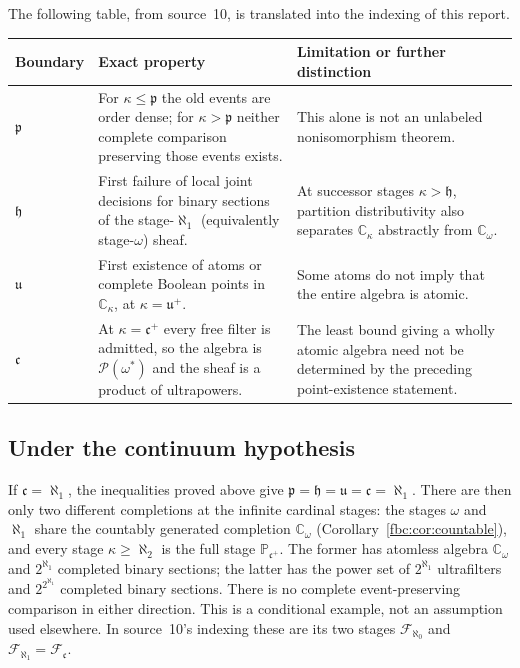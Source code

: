 \documentclass[11pt,letterpaper]{article}
\theoremstyle{definition}
\theoremstyle{remark}
\newcommand{\om}{\omega}
\newcommand{\C}{\mathbb C}
\newcommand{\PP}{\mathbb P}
\newcommand{\pow}{\mathcal P}
\newcommand{\cp}{\mathfrak p}
\newcommand{\cu}{\mathfrak u}
\newcommand{\cc}{\mathfrak c}
\newcommand{\ch}{\mathfrak h}
\begin{document}
The following table, from source~10, is translated into the indexing
of this report.
\begin{center}
\small
\begin{tabular}{@{}p{}p{}p{}@{}}
\toprule
Boundary & Exact property & Limitation or further distinction\\
\midrule
$\cp$ & For $\kappa\leq\cp$ the old events are order dense; for
$\kappa>\cp$ neither complete comparison preserving those events
exists. & This alone is not an unlabeled nonisomorphism theorem.\\[0.5em]
$\ch$ & First failure of local joint decisions for binary sections of
the stage-$\aleph_1$ (equivalently stage-$\om$) sheaf. & At successor
stages $\kappa>\ch$, partition distributivity also separates
$\C_\kappa$ abstractly from $\C_\om$.\\[0.5em]
$\cu$ & First existence of atoms or complete Boolean points in
$\C_\kappa$, at $\kappa=\cu^+$. & Some atoms do not imply that the
entire algebra is atomic.\\[0.5em]
$\cc$ & At $\kappa=\cc^+$ every free filter is admitted, so the algebra
is $\pow(\om^*)$ and the sheaf is a product of ultrapowers. & The least
bound giving a wholly atomic algebra need not be determined by the
preceding point-existence statement.\\
\bottomrule
\end{tabular}
\end{center}

\subsection{Under the continuum hypothesis}
If $\cc=\aleph_1$, the inequalities proved above give
$\cp=\ch=\cu=\cc=\aleph_1$. There are then only two different
completions at the infinite cardinal stages: the stages $\om$ and
$\aleph_1$ share the countably generated completion $\C_\om$
(Corollary~\ref{fbc:cor:countable}), and every stage $\kappa\geq\aleph_2$
is the full stage $\PP_{\cc^+}$. The former has atomless algebra $\C_\om$
and $2^{\aleph_1}$ completed binary sections; the latter has the
power set of $2^{\aleph_1}$ ultrafilters and $2^{2^{\aleph_1}}$
completed binary sections. There is no complete event-preserving
comparison in either direction. This is a conditional example, not an
assumption used elsewhere. In source~10's indexing these are its two
stages $\mathcal F_{\aleph_0}$ and $\mathcal F_{\aleph_1}=\mathcal F_\cc$.
\end{document}
